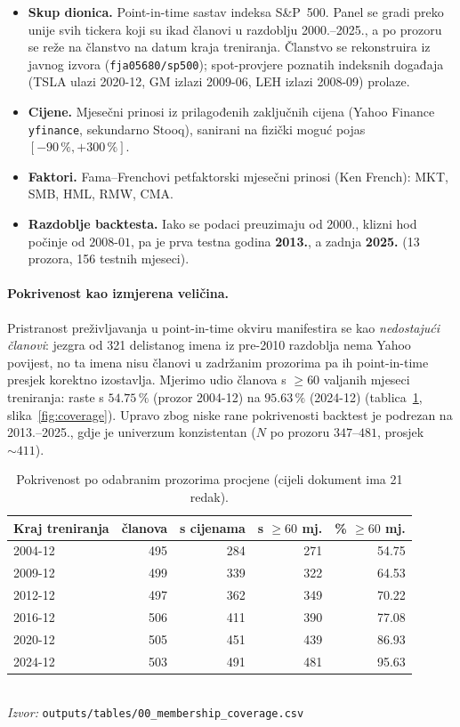 \documentclass[11pt]{article}
\newcommand{\izvor}[1]{{\footnotesize\textit{Izvor:} \texttt{#1}}}
\begin{document}
\begin{itemize}
  \item \textbf{Skup dionica.} Point-in-time sastav indeksa S\&P~500. Panel se
        gradi preko unije svih tickera koji su ikad članovi u razdoblju
        2000.--2025., a po prozoru se reže na članstvo na datum kraja treniranja.
        Članstvo se rekonstruira iz javnog izvora (\texttt{fja05680/sp500}); spot-provjere
        poznatih indeksnih događaja (TSLA ulazi 2020-12, GM izlazi 2009-06, LEH
        izlazi 2008-09) prolaze.
  \item \textbf{Cijene.} Mjesečni prinosi iz prilagođenih zaključnih cijena
        (Yahoo Finance \texttt{yfinance}, sekundarno Stooq), sanirani na fizički
        moguć pojas $[-90\,\%, +300\,\%]$.
  \item \textbf{Faktori.} Fama--Frenchovi petfaktorski mjesečni prinosi
        (Ken French): MKT, SMB, HML, RMW, CMA.
  \item \textbf{Razdoblje backtesta.} Iako se podaci preuzimaju od 2000., klizni
        hod počinje od $2008$-$01$, pa je prva testna godina \textbf{2013.}, a
        zadnja \textbf{2025.} (13 prozora, 156 testnih mjeseci).
\end{itemize}

\paragraph{Pokrivenost kao izmjerena veličina.} Pristranost preživljavanja u
point-in-time okviru manifestira se kao \emph{nedostajući članovi}: jezgra od
321 delistanog imena iz pre-2010 razdoblja nema Yahoo povijest, no ta imena nisu
članovi u zadržanim prozorima pa ih point-in-time presjek korektno izostavlja.
Mjerimo udio članova s $\ge 60$ valjanih mjeseci treniranja: raste s
$54.75\,\%$ (prozor 2004-12) na $95.63\,\%$ (2024-12) (tablica~\ref{tab:cov},
slika~\ref{fig:coverage}). Upravo zbog niske rane pokrivenosti backtest je
podrezan na 2013.--2025., gdje je univerzum konzistentan ($N$ po prozoru
$347$--$481$, prosjek $\sim 411$).

\begin{table}[!htbp]
  \centering
  \caption{Pokrivenost po odabranim prozorima procjene (cijeli dokument ima 21
  redak).}
  \label{tab:cov}
  \small
  \begin{tabular}{lrrrr}
    \toprule
    Kraj treniranja & članova & s cijenama & s $\ge 60$ mj. & \% $\ge 60$ mj. \\
    \midrule
    2004-12 & 495 & 284 & 271 & 54.75 \\
    2009-12 & 499 & 339 & 322 & 64.53 \\
    2012-12 & 497 & 362 & 349 & 70.22 \\
    2016-12 & 506 & 411 & 390 & 77.08 \\
    2020-12 & 505 & 451 & 439 & 86.93 \\
    2024-12 & 503 & 491 & 481 & 95.63 \\
    \bottomrule
  \end{tabular}\\[0.3em]
  \izvor{outputs/tables/00\_membership\_coverage.csv}
\end{table}
\end{document}
